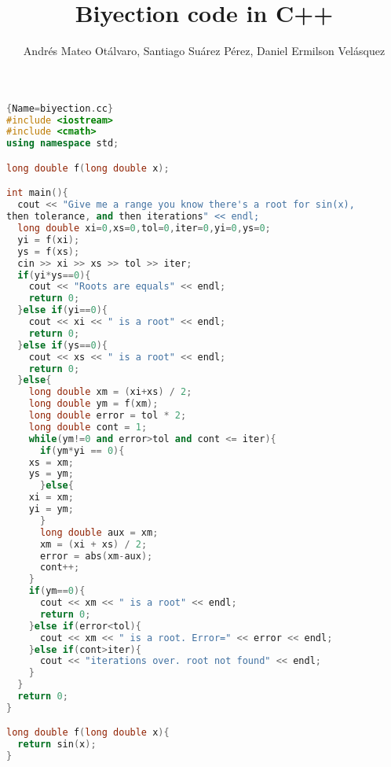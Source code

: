 \documentclass{article}
\author{Andrés Mateo Otálvaro, Santiago Suárez Pérez, Daniel Ermilson Velásquez}
\title{Biyection code in C++}
\begin{document}
\maketitle
\begin{lstlisting}[language=C++, caption=Biyection algorithm in C++]{Name=biyection.cc}
#include <iostream>
#include <cmath>
using namespace std;

long double f(long double x);

int main(){
  cout << "Give me a range you know there's a root for sin(x), 
then tolerance, and then iterations" << endl;
  long double xi=0,xs=0,tol=0,iter=0,yi=0,ys=0;
  yi = f(xi);
  ys = f(xs);
  cin >> xi >> xs >> tol >> iter;
  if(yi*ys==0){
    cout << "Roots are equals" << endl;
    return 0;
  }else if(yi==0){
    cout << xi << " is a root" << endl;
    return 0;
  }else if(ys==0){
    cout << xs << " is a root" << endl;
    return 0;
  }else{
    long double xm = (xi+xs) / 2;
    long double ym = f(xm);
    long double error = tol * 2;
    long double cont = 1;
    while(ym!=0 and error>tol and cont <= iter){
      if(ym*yi == 0){
	xs = xm;
	ys = ym;
      }else{
	xi = xm;
	yi = ym;
      }
      long double aux = xm;
      xm = (xi + xs) / 2;
      error = abs(xm-aux);
      cont++;
    }
    if(ym==0){
      cout << xm << " is a root" << endl;
      return 0;
    }else if(error<tol){
      cout << xm << " is a root. Error=" << error << endl;
    }else if(cont>iter){
      cout << "iterations over. root not found" << endl;
    }
  }
  return 0;
}

long double f(long double x){
  return sin(x);
}

\end{lstlisting}
\end{document}
